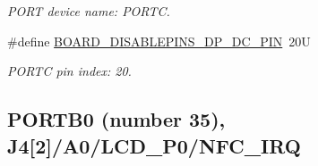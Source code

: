 \begin{DoxyCompactItemize}
\begin{DoxyCompactList}\small\item\em P\+O\+RT device name\+: P\+O\+R\+TC. \end{DoxyCompactList}\item 
\mbox{\label{group__pin__mux_ga7e546194c581178acba8c5803c03fa79}} 
\#define \mbox{\hyperlink{group__pin__mux_ga7e546194c581178acba8c5803c03fa79}{B\+O\+A\+R\+D\+\_\+\+D\+I\+S\+A\+B\+L\+E\+P\+I\+N\+S\+\_\+\+D\+P\+\_\+\+D\+C\+\_\+\+P\+IN}}~20U
\begin{DoxyCompactList}\small\item\em P\+O\+R\+TC pin index\+: 20. \end{DoxyCompactList}\end{DoxyCompactItemize}
\subsection*{P\+O\+R\+T\+B0 (number 35), J4\mbox{[}2\mbox{]}/\+A0/\+L\+C\+D\+\_\+\+P0/\+N\+F\+C\+\_\+\+I\+RQ}
